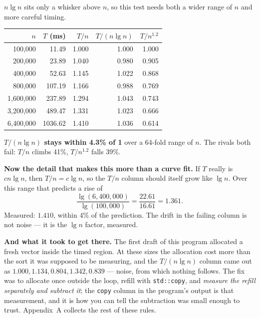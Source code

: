 \begin{worked}
$n \lg n$ sits only a whisker above $n$, so this test needs both a wider range
of $n$ and more careful timing.

\begin{center}
\begin{tabular}{@{}rrrrr@{}}
\toprule
\rowcolor{primary!15}
$n$ & $T$ (ms) & $T/n$ & $T/(n \lg n)$ & $T/n^{1.2}$ \\
\midrule
  100{,}000 &   11.49 & 1.000 & 1.000 & 1.000 \\
  200{,}000 &   23.89 & 1.040 & 0.980 & 0.905 \\
  400{,}000 &   52.63 & 1.145 & 1.022 & 0.868 \\
  800{,}000 &  107.19 & 1.166 & 0.988 & 0.769 \\
1{,}600{,}000 &  237.89 & 1.294 & 1.043 & 0.743 \\
3{,}200{,}000 &  489.47 & 1.331 & 1.023 & 0.666 \\
6{,}400{,}000 & 1036.62 & 1.410 & 1.036 & 0.614 \\
\bottomrule
\end{tabular}
\end{center}

\smallskip
\textbf{$T/(n\lg n)$ stays within 4.3\% of 1} over a 64-fold range of $n$. The
rivals both fail: $T/n$ climbs 41\%, $T/n^{1.2}$ falls 39\%.

\smallskip
\textbf{Now the detail that makes this more than a curve fit.} If $T$ really is
$cn\lg n$, then $T/n = c\lg n$, so the $T/n$ column should itself grow like
$\lg n$. Over this range that predicts a rise of
\[ \frac{\lg(6{,}400{,}000)}{\lg(100{,}000)}
   = \frac{22.61}{16.61} = 1.361. \]
Measured: $\mathbf{1.410}$, within 4\% of the prediction. The drift in the
failing column is not noise --- it is the $\lg n$ factor, measured.

\smallskip
\textbf{And what it took to get there.} The first draft of this program
allocated a fresh vector inside the timed region. At these sizes the allocation
cost more than the sort it was supposed to be measuring, and the
$T/(n \lg n)$ column came out as $1.000, 1.134, 0.804, 1.342, 0.839$ --- noise,
from which nothing follows. The fix was to allocate once outside the loop,
refill with \texttt{std::copy}, and \emph{measure the refill separately and
subtract it}; the \texttt{copy} column in the program's output is that
measurement, and it is how you can tell the subtraction was small enough to
trust. Appendix~A collects the rest of these rules.
\end{worked}


